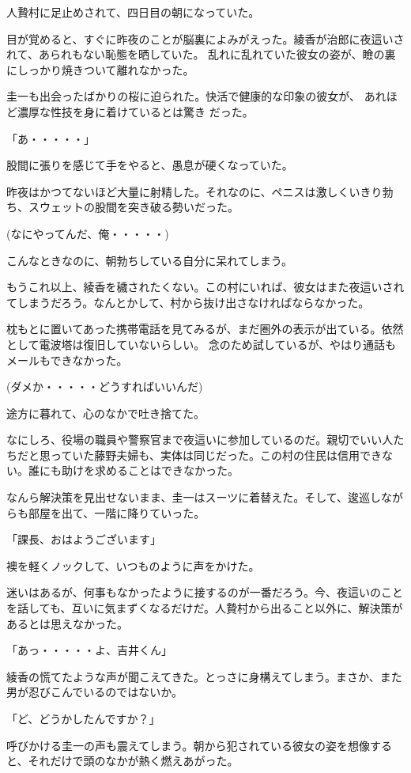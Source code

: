 ﻿\documentclass[book,tate]{jlreq}
\begin{document}
人贄村に足止めされて、四日目の朝になっていた。

目が覚めると、すぐに昨夜のことが脳裏によみがえった。綾香が治郎に夜這いされて、あられもない恥態を晒していた。 乱れに乱れていた彼女の姿が、瞼の裏にしっかり焼きついて離れなかった。

圭一も出会ったばかりの桜に迫られた。快活で健康的な印象の彼女が、 あれほど濃厚な性技を身に着けているとは驚き だった。

「あ・・・・・」

股間に張りを感じて手をやると、愚息が硬くなっていた。

昨夜はかつてないほど大量に射精した。それなのに、ペニスは激しくいきり勃ち、スウェットの股間を突き破る勢いだった。

(なにやってんだ、俺・・・・・)

こんなときなのに、朝勃ちしている自分に呆れてしまう。

もうこれ以上、綾香を穢されたくない。この村にいれば、彼女はまた夜這いされてしまうだろう。なんとかして、村から抜け出さなければならなかった。

枕もとに置いてあった携帯電話を見てみるが、まだ圏外の表示が出ている。依然として電波塔は復旧していないらしい。 念のため試しているが、やはり通話もメールもできなかった。

(ダメか・・・・・どうすればいいんだ)

途方に暮れて、心のなかで吐き捨てた。

なにしろ、役場の職員や警察官まで夜這いに参加しているのだ。親切でいい人たちだと思っていた藤野夫婦も、実体は同じだった。この村の住民は信用できない。誰にも助けを求めることはできなかった。

なんら解決策を見出せないまま、圭一はスーツに着替えた。そして、逡巡しながらも部屋を出て、一階に降りていった。

「課長、おはようございます」

襖を軽くノックして、いつものように声をかけた。

迷いはあるが、何事もなかったように接するのが一番だろう。今、夜這いのことを話しても、互いに気まずくなるだけだ。人贄村から出ること以外に、解決策があるとは思えなかった。

「あっ・・・・・よ、吉井くん」

綾香の慌てたような声が聞こえてきた。とっさに身構えてしまう。まさか、また男が忍びこんでいるのではないか。

「ど、どうかしたんですか？」

呼びかける圭一の声も震えてしまう。朝から犯されている彼女の姿を想像すると、それだけで頭のなかが熱く燃えあがった。
\end{document}
